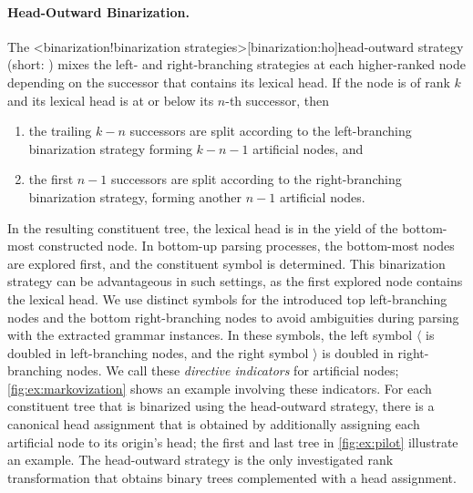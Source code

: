 \documentclass[../../document.tex]{subfiles}
\begin{document}
    \paragraph{Head-Outward Binarization.}
    The <binarization!binarization strategies>[binarization:ho]{head-outward strategy} (short: ) mixes the left- and right-branching strategies at each higher-ranked node depending on the successor that contains its lexical head.
    If the node is of rank \(k\) and its lexical head is at or below its \(n\)-th successor, then
    \begin{enumerate}
        \item the trailing \(k-n\) successors are split according to the left-branching binarization strategy forming \(k-n-1\) artificial nodes, and
        \item the first \(n-1\) successors are split according to the right-branching binarization strategy, forming another \(n-1\) artificial nodes.
    \end{enumerate}
    In the resulting constituent tree, the lexical head is in the yield of the bottom-most constructed node.
    In bottom-up parsing processes, the bottom-most nodes are explored first, and the constituent symbol is determined.
    This binarization strategy can be advantageous in such settings, as the first explored node contains the lexical head.
    We use distinct symbols for the introduced top left-branching nodes and the bottom right-branching nodes to avoid ambiguities during parsing with the extracted grammar instances.
    In these symbols, the left symbol \(\langle\) is doubled in left-branching nodes, and the right symbol \(\rangle\) is doubled in right-branching nodes.
    We call these \emph{directive indicators} for artificial nodes; \cref{fig:ex:markovization} shows an example involving these indicators.
    For each constituent tree that is binarized using the head-outward strategy, there is a canonical head assignment that is obtained by additionally assigning each artificial node to its origin's head; the first and last tree in \cref{fig:ex:pilot} illustrate an example.
    The head-outward strategy is the only investigated rank transformation that obtains binary trees complemented with a head assignment.
\end{document}
